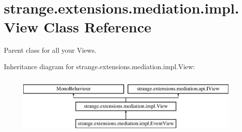 \hypertarget{classstrange_1_1extensions_1_1mediation_1_1impl_1_1_view}{\section{strange.\-extensions.\-mediation.\-impl.\-View Class Reference}
\label{classstrange_1_1extensions_1_1mediation_1_1impl_1_1_view}
}


Parent class for all your Views.  


Inheritance diagram for strange.\-extensions.\-mediation.\-impl.\-View\-:\begin{figure}[H]
\begin{center}
\leavevmode
\includegraphics[height=3.000000cm]{classstrange_1_1extensions_1_1mediation_1_1impl_1_1_view}
\end{center}
\end{figure}
